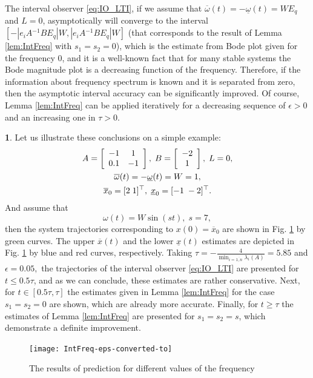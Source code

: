 \documentclass[twocolumn,english]{IEEEtran}
\theoremstyle{plain}
\theoremstyle{definition}
\newtheorem*{example*}{\protect\examplename}
\theoremstyle{plain}
\theoremstyle{plain}
\theoremstyle{remark}
\providecommand{\examplename}{Example}
\begin{document}
The interval observer \eqref{eq:IO_LTI}, if we assume that $\overline{\omega}(t)=-\underline{\omega}(t)=WE_{q}$ and $L=0$, asymptotically will converge to the interval $[-|e_{i}A{}^{-1}BE_{q}|W,|e_{i}A{}^{-1}BE_{q}|W]$ (that corresponds to the result of Lemma \ref{lem:IntFreq} with $s_{1}=s_{2}=0$), which is the estimate from Bode plot given for the frequency $0$, and it is a well-known fact that for many stable systems the Bode magnitude plot is a decreasing function of the frequency. Therefore, if the information about frequency spectrum is known and it is separated from zero, then the asymptotic interval accuracy can be significantly improved. Of course, Lemma \ref{lem:IntFreq} can be applied iteratively for a decreasing sequence of $\epsilon>0$ and an increasing one in $\tau>0$.
\begin{example*}
Let us illustrate these conclusions on a simple example:
\begin{gather*}
A=\left[\begin{array}{cc}
-1 & 1\\
0.1 & -1
\end{array}\right],\;B=\left[\begin{array}{c}
-2\\
1
\end{array}\right],\;L=0,\\
\overline{\omega}(t)=-\underline{\omega}(t)=W=1,\\
\overline{x}_{0}=[2\;1]^{\top},\;\underline{x}_{0}=[-1\;-2]^{\top}.
\end{gather*}
And assume that
\[
\omega(t)=W\sin(st),\;s=7,
\]
then the system trajectories corresponding to $x(0)=\overline{x}_{0}$ are shown in Fig. \ref{fig:IntFreq} by green curves. The upper $\overline{x}(t)$ and the lower $\underline{x}(t)$ estimates are depicted in Fig. \ref{fig:IntFreq} by blue and red curves, respectively. Taking $\tau=-\frac{4}{\min_{i=\overline{1,n}}\lambda_{i}(A)}=5.85$ and $\epsilon=0.05,$ the trajectories of the interval observer \eqref{eq:IO_LTI} are presented for $t\leq0.5\tau$, and as we can conclude, these estimates are rather conservative. Next, for $t\in[0.5\tau,\tau]$ the estimates given in Lemma \ref{lem:IntFreq} for the case $s_{1}=s_{2}=0$ are shown, which are already more accurate. Finally, for $t\geq\tau$ the estimates of Lemma \ref{lem:IntFreq} are presented for $s_{1}=s_{2}=s$, which demonstrate a definite improvement. 
\begin{figure}
\begin{centering}
\texttt{[image: IntFreq-eps-converted-to]}
\par\end{centering}
\caption{\label{fig:IntFreq} The results of prediction for different values
of the frequency}
\end{figure}
\end{example*}
\end{document}
